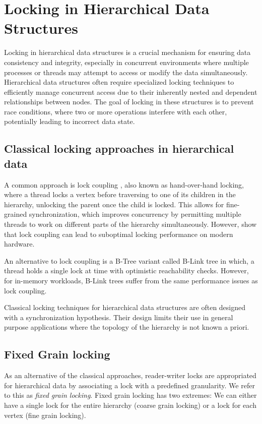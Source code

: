 \section{Locking in Hierarchical Data Structures}
Locking in hierarchical data structures is a crucial mechanism for ensuring data consistency and integrity, especially in concurrent environments where multiple processes or threads may attempt to access or modify the data simultaneously. 
Hierarchical data structures often require specialized locking techniques to efficiently manage concurrent access due to their inherently nested and dependent relationships between nodes. 
The goal of locking in these structures is to prevent race conditions, where two or more operations interfere with each other, potentially leading to incorrect data state. 

\subsection{Classical locking approaches in hierarchical data}
A common approach is lock coupling \cite{BayerS77}, also known as hand-over-hand locking, where a thread locks a vertex before traversing to one of its children in the hierarchy, unlocking the parent once the child is locked. 
This allows for fine-grained synchronization, which improves concurrency by permitting multiple threads to work on different parts of the hierarchy simultaneously. 
However, \citet{LeisH019} show that lock coupling can lead to suboptimal locking performance on modern hardware. 


An alternative to lock coupling is a B-Tree variant called B-Link tree \cite{LehmanY81} in which, a thread holds a single lock at time with optimistic reachability checks. 
However, for in-memory workloads, B-Link trees suffer from the same performance issues as lock coupling.

Classical locking techniques for hierarchical data structures are often designed with a synchronization hypothesis. 
Their design limits their use in general purpose applications where the topology of the hierarchy is not known a priori. 

\subsection{Fixed Grain locking}
As an alternative of the classical approaches, reader-writer locks are appropriated for hierarchical data by associating a lock with a predefined granularity. 
We refer to this as \emph{fixed grain locking}. 
Fixed grain locking has two extremes: We can either have a single lock for the entire hierarchy (coarse grain locking) or a lock for each vertex (fine grain locking).



